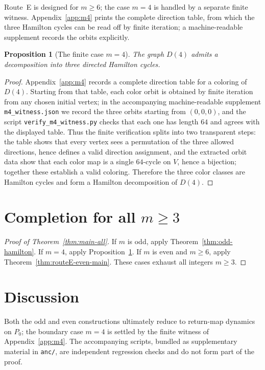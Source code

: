\documentclass[11pt]{article}
\newtheorem{proposition}{Proposition}
\begin{document}
Route~E is designed for $m\ge 6$; the case $m=4$ is handled by a separate finite witness.
Appendix~\ref{app:m4} prints the complete direction table, from which the three Hamilton cycles can be read off by finite iteration; a machine-readable supplement records the orbits explicitly.

\begin{proposition}[The finite case $m=4$]\label{prop:m4-main}
The graph $D(4)$ admits a decomposition into three directed Hamilton cycles.
\end{proposition}

\begin{proof}
Appendix~\ref{app:m4} records a complete direction table for a coloring of $D(4)$.
Starting from that table, each color orbit is obtained by finite iteration from any chosen initial vertex; in the accompanying machine-readable supplement \texttt{m4\_witness.json} we record the three orbits starting from $(0,0,0)$, and the script \texttt{verify\_m4\_witness.py} checks that each one has length $64$ and agrees with the displayed table.
Thus the finite verification splits into two transparent steps: the table shows that every vertex sees a permutation of the three allowed directions, hence defines a valid direction assignment, and the extracted orbit data show that each color map is a single $64$-cycle on $V$, hence a bijection; together these establish a valid coloring.
Therefore the three color classes are Hamilton cycles and form a Hamilton decomposition of $D(4)$.
\end{proof}


\section{Completion for all $m\ge 3$}\label{sec:completion}

\begin{proof}[Proof of Theorem~\ref{thm:main-all}]
If $m$ is odd, apply Theorem~\ref{thm:odd-hamilton}.
If $m=4$, apply Proposition~\ref{prop:m4-main}.
If $m$ is even and $m\ge 6$, apply Theorem~\ref{thm:routeE-even-main}.
These cases exhaust all integers $m\ge 3$.
\end{proof}

\section{Discussion}\label{sec:discussion}

Both the odd and even constructions ultimately reduce to return-map dynamics on $P_0$; the boundary case $m=4$ is settled by the finite witness of Appendix~\ref{app:m4}.
The accompanying scripts, bundled as supplementary material in \texttt{anc/}, are independent regression checks and do not form part of the proof.
\end{document}
